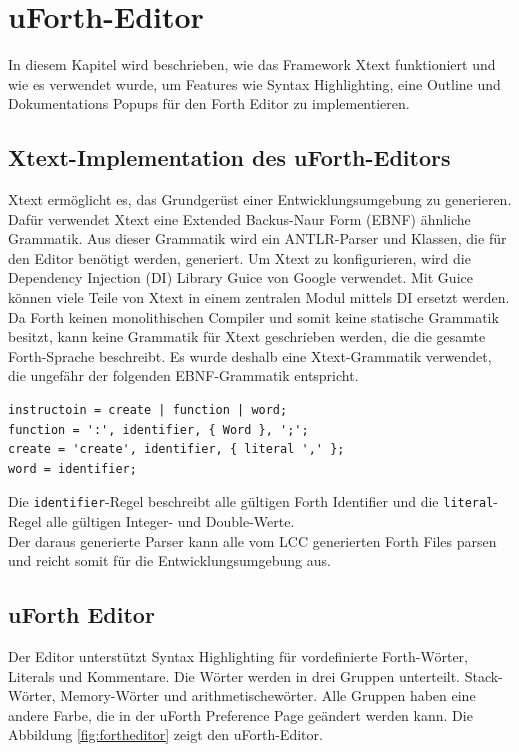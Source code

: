 \chapter{uForth-Editor}
\label{chap:fortheditor}
In diesem Kapitel wird beschrieben, wie das Framework Xtext funktioniert und wie es verwendet wurde, um Features wie Syntax Highlighting, eine Outline und Dokumentations Popups für den Forth Editor zu implementieren.

\section{Xtext-Implementation des uForth-Editors}
Xtext ermöglicht es, das Grundgerüst einer Entwicklungsumgebung zu generieren. Dafür verwendet Xtext eine Extended Backus-Naur Form (EBNF) ähnliche Grammatik. Aus dieser Grammatik wird ein ANTLR-Parser und Klassen, die für den Editor benötigt werden, generiert. Um Xtext zu konfigurieren, wird die Dependency Injection (DI) Library Guice von Google verwendet. Mit Guice können viele Teile von Xtext in einem zentralen Modul mittels DI ersetzt werden.\\
Da Forth keinen monolithischen Compiler und somit keine statische Grammatik besitzt, kann keine Grammatik für Xtext geschrieben werden, die die gesamte Forth-Sprache beschreibt. Es wurde deshalb eine Xtext-Grammatik verwendet, die ungefähr der folgenden EBNF-Grammatik entspricht.

\begin{verbatim}
instructoin = create | function | word;
function = ':', identifier, { Word }, ';';
create = 'create', identifier, { literal ',' };
word = identifier;
\end{verbatim}

Die \verb!identifier!-Regel beschreibt alle gültigen Forth Identifier und die \verb!literal!-Regel alle gültigen Integer- und Double-Werte.
\\
Der daraus generierte Parser kann alle vom LCC generierten Forth Files parsen und reicht somit für die Entwicklungsumgebung aus. 

\newpage
\section{uForth Editor}
Der Editor unterstützt Syntax Highlighting für vordefinierte Forth-Wörter, Literals und Kommentare. Die Wörter werden in drei Gruppen unterteilt. Stack-Wörter, Memory-Wörter und arithmetischewörter. Alle Gruppen haben eine andere Farbe, die in der uForth Preference Page geändert werden kann. Die Abbildung \ref{fig:fortheditor} zeigt den uForth-Editor.


